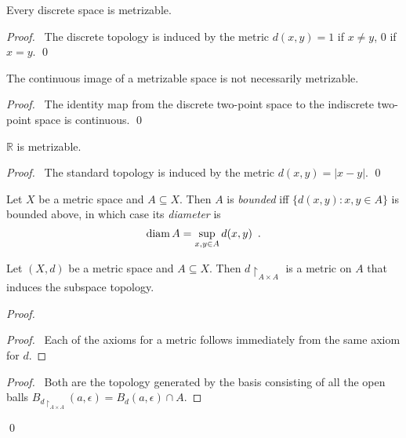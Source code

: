 \begin{lm}
  Every discrete space is metrizable.
\end{lm}

\begin{proof}
  \pf\ The discrete topology is induced by the metric $d(x, y) = 1$ if $x
  \neq
  y$, 0 if $x = y$. \qed
\end{proof}

\begin{prop}
  The continuous image of a metrizable space is not necessarily metrizable.
\end{prop}

\begin{proof}
  \pf\ The identity map from the discrete two-point space to the indiscrete two-point space is continuous. \qed
\end{proof}

\begin{lm}
  $\mathbb{R}$ is metrizable.
\end{lm}

\begin{proof}
  \pf\ The standard topology is induced by the metric $d(x, y) = |x-y|$. \qed
\end{proof}

\begin{df}[Bounded]
  Let $X$ be a metric space and $A \subseteq X$. Then $A$ is \emph{bounded}
  iff $\{ d(x, y) : x, y \in A \}$ is bounded above, in which case its
  \emph{diameter} is
  \[ \operatorname{diam} A = \sup_{x, y \in A} d(x, y) \enspace . \]
\end{df}

\begin{lm}
  \label{lm:topology:metric:subspace}
  Let $(X, d)$ be a metric space and $A \subseteq X$. Then $d \restriction_{A
    \times A}$ is a metric on $A$ that induces the subspace topology.
\end{lm}

\begin{proof}
  \pf
  \begin{proof}
    \pf\ Each of the axioms for a metric follows immediately from the same
    axiom for $d$.
  \end{proof}
  \begin{proof}
    \pf\ Both are the topology generated by the basis consisting of all
    the open balls $B_{d \restriction_{A \times A}}(a, \epsilon) = B_d(a,
    \epsilon)  \cap      A$.
  \end{proof}
  \qed
\end{proof}

